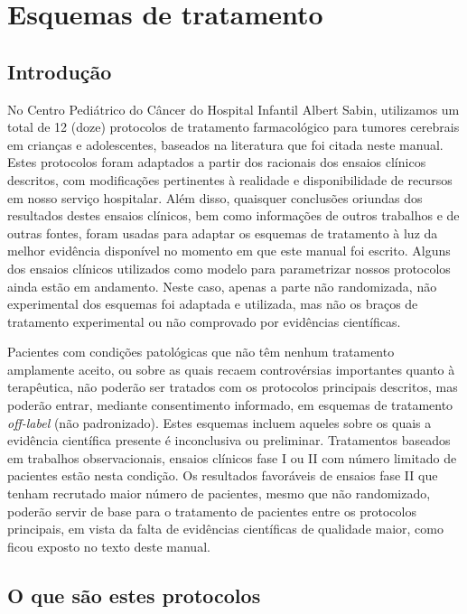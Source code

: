 \documentclass[11pt,a4paper,oldfontcommands]{memoir}
\begin{document}



\appendix

\chapter{Esquemas de tratamento}

\section{Introdução}
No Centro Pediátrico do Câncer do Hospital Infantil Albert Sabin, utilizamos um total de 12 (doze) protocolos de tratamento farmacológico para tumores cerebrais em crianças e adolescentes, baseados na literatura que foi citada neste manual. Estes protocolos foram adaptados a partir dos racionais dos ensaios clínicos descritos, com modificações pertinentes à realidade e disponibilidade de recursos em nosso serviço hospitalar. Além disso, quaisquer conclusões oriundas dos resultados destes ensaios clínicos, bem como informações de outros trabalhos e de outras fontes, foram usadas para adaptar os esquemas de tratamento à luz da melhor evidência disponível no momento em que este manual foi escrito. Alguns dos ensaios clínicos utilizados como modelo para parametrizar nossos protocolos ainda estão em andamento. Neste caso, apenas a parte não randomizada, não experimental dos esquemas foi adaptada e utilizada, mas não os braços de tratamento experimental ou não comprovado por evidências científicas.

Pacientes com condições patológicas que não têm nenhum tratamento amplamente aceito, ou sobre as quais recaem controvérsias importantes quanto à terapêutica, não poderão ser tratados com os protocolos principais descritos, mas poderão entrar, mediante consentimento informado, em esquemas de tratamento \textit{off-label} (não padronizado). Estes esquemas incluem aqueles sobre os quais a evidência científica presente é inconclusiva ou preliminar. Tratamentos baseados em trabalhos observacionais, ensaios clínicos fase I ou II com número limitado de pacientes estão nesta condição. Os resultados favoráveis de ensaios fase II que tenham recrutado maior número de pacientes, mesmo que não randomizado, poderão servir de base para o tratamento de pacientes entre os protocolos principais, em vista da falta de evidências científicas de qualidade maior, como ficou exposto no texto deste manual.

\section{O que são estes protocolos}
\end{document}
